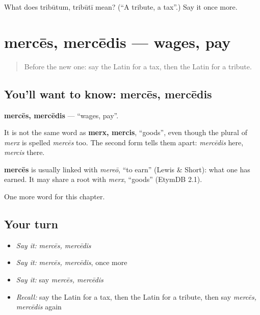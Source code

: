 \begin{tcolorbox}[breakable,colback=teal!4,colframe=teal!35!black,title={Before you move on}]
What does tribūtum, tribūtī mean? (\textquotedblleft{}A tribute, a tax\textquotedblright{}.) Say it once more.
\end{tcolorbox}
\section[mercēs, mercēdis]{mercēs, mercēdis — wages, pay}

\label{lesson:LA-C190-merces}



\begin{quote}
Before the new one: say the Latin for a tax, then the Latin for a tribute.
\end{quote}

\subsection*{You'll want to know: mercēs, mercēdis}
\textbf{mercēs, mercēdis} — \textquotedblleft{}wages, pay\textquotedblright{}.

It is not the same word as \textbf{merx, mercis}, \textquotedblleft{}goods\textquotedblright{}, even though the plural of \emph{merx} is spelled \emph{mercēs} too. The second form tells them apart: \emph{mercēdis} here, \emph{mercis} there.

\begin{cousinweb}
\textbf{mercēs} is usually linked with \emph{mereō}, \textquotedblleft{}to earn\textquotedblright{} (Lewis \& Short): what one has earned. It may share a root with \emph{merx}, \textquotedblleft{}goods\textquotedblright{} (EtymDB 2.1).
\end{cousinweb}

\begin{grammarlens}[title={What you've built}]
One more word for this chapter.
\end{grammarlens}

\subsection*{Your turn}
\begin{itemize}
\raggedright
  \item \emph{Say it:} \emph{mercēs, mercēdis}
  \item \emph{Say it:} \emph{mercēs, mercēdis}, once more
  \item \emph{Say it:} say \emph{mercēs, mercēdis}
  \item \emph{Recall:} say the Latin for a tax, then the Latin for a tribute, then say \emph{mercēs, mercēdis} again
\end{itemize}

